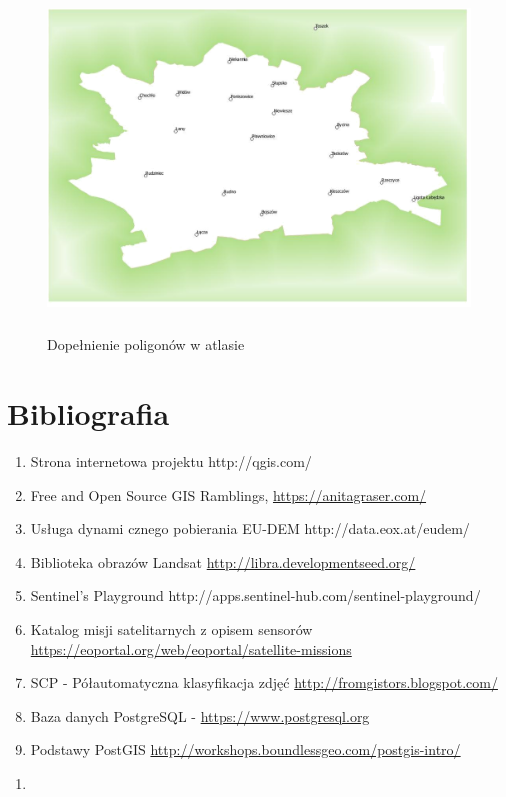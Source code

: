 \documentclass[12pt,a4paper]{book}
\begin{document}
\begin{center}
\begin{figure}
\includegraphics[width=13cm,height=9.176cm]{008-atlas-dopelnienie.png}
\caption{Dopełnienie poligonów w atlasie}
\end{figure}
\end{center}

\section{Bibliografia}

\begin{enumerate}
\item Strona internetowa projektu http://qgis.com/
\item Free and Open Source GIS Ramblings, \url{https://anitagraser.com/}
\item Usługa dynami cznego pobierania EU-DEM http://data.eox.at/eudem/
\item Biblioteka obrazów Landsat \url{http://libra.developmentseed.org/}
\item Sentinel’s Playground http://apps.sentinel-hub.com/sentinel-playground/
\item Katalog misji satelitarnych z opisem sensorów 
\\ \url{https://eoportal.org/web/eoportal/satellite-missions}
\item SCP - Półautomatyczna klasyfikacja zdjęć \url{http://fromgistors.blogspot.com/}
\item Baza danych PostgreSQL - \url{https://www.postgresql.org}
\item Podstawy PostGIS \url{http://workshops.boundlessgeo.com/postgis-intro/}
\end{enumerate}
\setcounter{tocdepth}{10}
\renewcommand\contentsname{Spis treści}
\tableofcontents
\begin{enumerate}
\item[] \end{enumerate}
\end{document}
